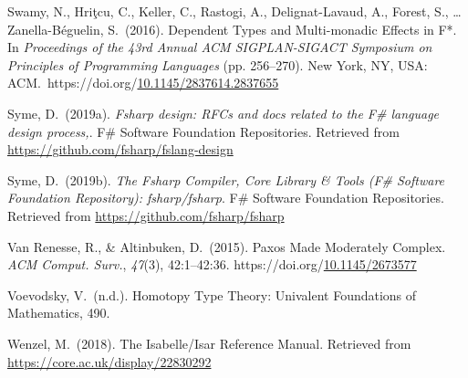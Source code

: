 \documentclass[12pt,twoside]{article}
\begin{document}
{\begin{thebibliography}{222}
\mdbibitemlabel{[Swamy et al., 2016]}Swamy, N., Hriţcu, C., Keller, C., Rastogi, A., Delignat-Lavaud, A., Forest, S., … Zanella-Béguelin, S.~(2016). Dependent Types and Multi-monadic Effects in F*. In \emph{Proceedings of the 43rd Annual ACM SIGPLAN-SIGACT Symposium on Principles of Programming Languages} (pp. 256–270). New York, NY, USA: ACM.~https://doi.org/\href{https://dx.doi.org/10.1145/2837614.2837655}{10.1145/2837614.2837655}\label{swamy_dependent_2016}%

\mdbibitemlabel{[Syme, 2019a]}Syme, D.~(2019a). \emph{Fsharp design: RFCs and docs related to the F\# language design process,}. F\# Software Foundation Repositories. Retrieved from \href{https://github.com/fsharp/fslang-design}{{\ttfamily https://\hspace{0pt}github.\hspace{0pt}com/\hspace{0pt}fsharp/\hspace{0pt}fslang-\hspace{0pt}design}}\label{syme_fsharp_2019}%

\mdbibitemlabel{[Syme, 2019b]}Syme, D.~(2019b). \emph{The Fsharp Compiler, Core Library \& Tools (F\# Software Foundation Repository): fsharp/fsharp}. F\# Software Foundation Repositories. Retrieved from \href{https://github.com/fsharp/fsharp}{{\ttfamily https://\hspace{0pt}github.\hspace{0pt}com/\hspace{0pt}fsharp/\hspace{0pt}fsharp}}\label{syme_fsharp_2019-1}%

Van Renesse, R., \& Altinbuken, D.~(2015). Paxos Made Moderately Complex. \emph{ACM Comput. Surv.}, \emph{47}(3), 42:1–42:36. https://doi.org/\href{https://dx.doi.org/10.1145/2673577}{10.1145/2673577}\label{van_renesse_paxos_2015}%

\mdbibitemlabel{[Voevodsky, n.d.]}Voevodsky, V.~(n.d.). Homotopy Type Theory: Univalent Foundations of Mathematics, 490.\label{voevodsky_homotopy_nodate}%

\mdbibitemlabel{[Wenzel, 2018]}Wenzel, M.~(2018). The Isabelle/Isar Reference Manual. Retrieved from \href{https://core.ac.uk/display/22830292}{{\ttfamily https://\hspace{0pt}core.\hspace{0pt}ac.\hspace{0pt}uk/\hspace{0pt}display/\hspace{0pt}22830292}}\label{wenzel_isabelle/isar_2018}%


\end{thebibliography}}
\end{document}
